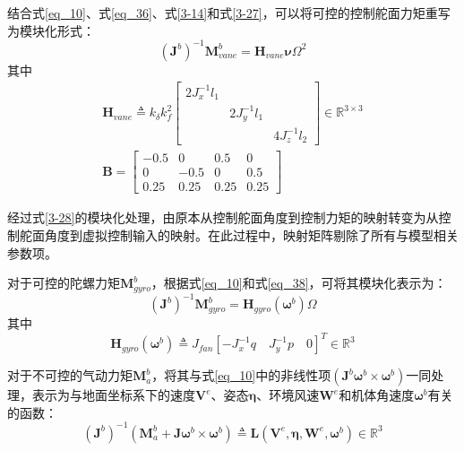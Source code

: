 结合式\eqref{eq_10}、式\eqref{eq_36}、式\eqref{3-14}和式\eqref{3-27}，可以将可控的控制舵面力矩重写为模块化形式：
\begin{equation}
    (\boldsymbol{J}^b)^{-1}\boldsymbol{M}_{vane}^b=\boldsymbol{H}_{vane}\boldsymbol{\nu}\Omega^2
    \label{3-28}
\end{equation}
其中
\begin{gather}
\left.\boldsymbol{H}_{vane}\triangleq k_{\delta}k_f^2\left[
    \begin{array}
    {ccc}2J_x^{-1}l_1 & & \\
        & 2J_y^{-1}l_1 & \\
        & & 4J_z^{-1}l_2
    \end{array}\right.\right]\in\mathbb{R}^{3\times3}
    \label{3-29}\\
    \boldsymbol{B}=
    \begin{bmatrix}
    -0.5 & 0 & 0.5 & 0 \\
    0 & -0.5 & 0 & 0.5 \\
    0.25 & 0.25 & 0.25 & 0.25
    \end{bmatrix}
    \label{3-30}
\end{gather}

经过式\eqref{3-28}的模块化处理，由原本从控制舵面角度到控制力矩的映射转变为从控制舵面角度到虚拟控制输入的映射。在此过程中，映射矩阵剔除了所有与模型相关参数项。

对于可控的陀螺力矩$\boldsymbol{M}_{gyro}^b$，根据式\eqref{eq_10}和式\ref{eq_38}，可将其模块化表示为：
\begin{equation}
    (\boldsymbol{J}^b)^{-1}\boldsymbol{M}_{gyro}^b=\boldsymbol{H}_{gyro}(\boldsymbol{\omega}^b)\Omega
    \label{3-31}
\end{equation}
其中
\begin{equation}
    \boldsymbol{H}_{gyro}(\boldsymbol{\omega}^b) \triangleq J_{fan}[-J_x^{-1}q\quad J_y^{-1}p\quad0]^T\in\mathbb{R}^{3}
    \label{3-32}
\end{equation}

对于不可控的气动力矩$\boldsymbol{M}_{a}^b$，将其与式\eqref{eq_10}中的非线性项$(\boldsymbol{J}^b\boldsymbol{\omega}^b\times\boldsymbol{\omega}^b)$一同处理，表示为与地面坐标系下的速度$\boldsymbol{V}^e$、姿态$\boldsymbol{\eta}$、环境风速$\boldsymbol{W}^e$和机体角速度$\boldsymbol{\omega}^b$有关的函数：
\begin{equation}
    ({\boldsymbol{J}^b})^{-1}(\boldsymbol{M}_{a}^b+\boldsymbol{J}\boldsymbol{\omega}^b\times\boldsymbol{\omega}^b)\triangleq \boldsymbol{L}(\boldsymbol{V}^e,\boldsymbol{\eta},\boldsymbol{W}^e,\boldsymbol{\omega}^b)\in\mathbb{R}^3
    \label{3-33}
\end{equation}

